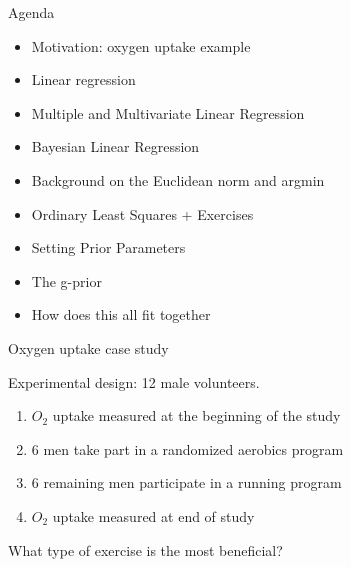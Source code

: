 \documentclass[
  ignorenonframetext,
]{beamer}
\providecommand{\tightlist}{%
  \setlength{\itemsep}{0pt}\setlength{\parskip}{0pt}}
\begin{document}
\begin{frame}{Agenda}
\protect\hypertarget{agenda}{}

\begin{itemize}
\tightlist
\item
  Motivation: oxygen uptake example
\item
  Linear regression
\item
  Multiple and Multivariate Linear Regression
\item
  Bayesian Linear Regression
\item
  Background on the Euclidean norm and argmin
\item
  Ordinary Least Squares + Exercises
\item
  Setting Prior Parameters
\item
  The g-prior
\item
  How does this all fit together
\end{itemize}

\end{frame}

\begin{frame}{Oxygen uptake case study}
\protect\hypertarget{oxygen-uptake-case-study}{}

Experimental design: 12 male volunteers.

\begin{enumerate}
\item $O_2$ uptake measured at the beginning of the study
\item 6 men take part in a randomized aerobics program
\item 6 remaining men participate in a running program
\item $O_2$ uptake measured at end of study
\end{enumerate}

What type of exercise is the most beneficial?

\end{frame}
\end{document}
